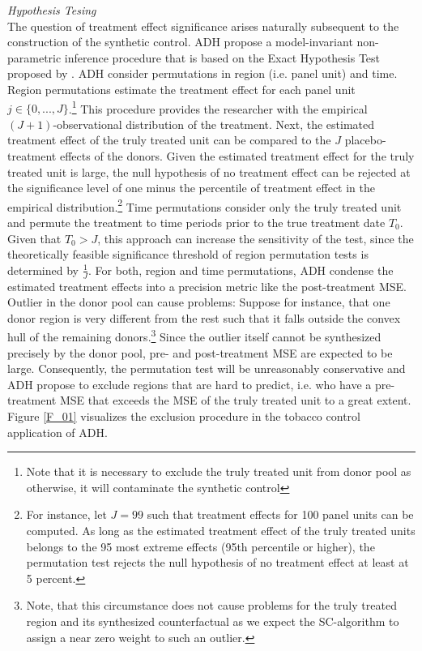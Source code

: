 \textit{Hypothesis Tesing}\\
The question of treatment effect significance arises naturally subsequent to the construction of the synthetic control. \ac{ADH} propose a model-invariant non-parametric inference procedure that is based on the Exact Hypothesis Test proposed by \cite{fisher:1971}. %
\ac{ADH} consider permutations in region (i.e. panel unit) and time. Region permutations estimate the treatment effect for each panel unit $j \in \{0, ..., J \}$.\footnote{Note that it is necessary to exclude the truly treated unit from donor pool as otherwise, it will contaminate the synthetic control} This procedure provides the researcher with the empirical $(J+1)$-observational distribution of the treatment. Next, the estimated treatment effect of the truly treated unit can be compared to the $J$ placebo-treatment effects of the donors. Given the estimated treatment effect for the truly treated unit is large, the null hypothesis of no treatment effect can be rejected at the significance level of one minus the percentile of treatment effect in the empirical distribution.\footnote{For instance, let $J = 99$ such that treatment effects for 100 panel units can be computed. As long as the estimated treatment effect of the truly treated units belongs to the 95 most extreme effects (95th percentile or higher), the permutation test rejects the null hypothesis of no treatment effect at least at 5 percent.} Time permutations consider only the truly treated unit and permute the treatment to time periods prior to the true treatment date $T_0$. Given that $T_0 > J$, this approach can increase the sensitivity of the test, since the theoretically feasible significance threshold of region permutation tests is determined by $\frac{1}{J}$. For both, region and time permutations, \ac{ADH} condense the estimated treatment effects into a precision metric like the post-treatment \ac{MSE}. Outlier in the donor pool can cause problems: Suppose for instance, that one donor region is very different from the rest such that it falls outside the convex hull of the remaining donors.\footnote{Note, that this circumstance does not cause problems for the truly treated region and its synthesized counterfactual as we expect the \ac{SC}-algorithm to assign a near zero weight to such an outlier. } Since the outlier itself cannot be synthesized precisely by the donor pool, pre- and post-treatment \ac{MSE} are expected to be large. Consequently, the permutation test will be unreasonably conservative and \ac{ADH} propose to exclude regions that are hard to predict, i.e. who have a pre-treatment \ac{MSE} that exceeds the \ac{MSE} of the truly treated unit to a great extent. Figure \ref{F_01} visualizes the exclusion procedure in the tobacco control application of \ac{ADH}. 

